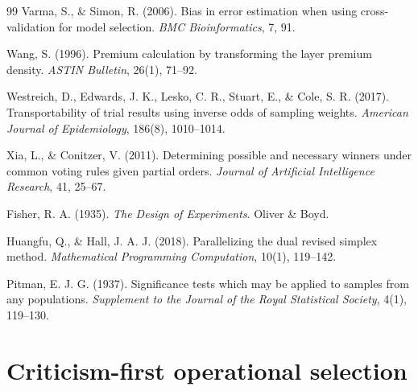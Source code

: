 \documentclass[11pt]{article}
\theoremstyle{remark}
\begin{document}
\begin{thebibliography}{99}
Varma, S., \& Simon, R. (2006).
Bias in error estimation when using cross-validation for model selection.
\emph{BMC Bioinformatics}, 7, 91.

Wang, S. (1996).
Premium calculation by transforming the layer premium density.
\emph{ASTIN Bulletin}, 26(1), 71--92.

Westreich, D., Edwards, J. K., Lesko, C. R., Stuart, E., \& Cole, S. R. (2017).
Transportability of trial results using inverse odds of sampling weights.
\emph{American Journal of Epidemiology}, 186(8), 1010--1014.

Xia, L., \& Conitzer, V. (2011).
Determining possible and necessary winners under common voting rules given partial orders.
\emph{Journal of Artificial Intelligence Research}, 41, 25--67.

Fisher, R. A. (1935).
\emph{The Design of Experiments}.
Oliver \& Boyd.

Huangfu, Q., \& Hall, J. A. J. (2018).
Parallelizing the dual revised simplex method.
\emph{Mathematical Programming Computation}, 10(1), 119--142.

Pitman, E. J. G. (1937).
Significance tests which may be applied to samples from any populations.
\emph{Supplement to the Journal of the Royal Statistical Society}, 4(1), 119--130.

\end{thebibliography}

\clearpage

\appendix

\section{Criticism-first operational selection}
\label{app:multi-system-operational-criticism}
\end{document}
